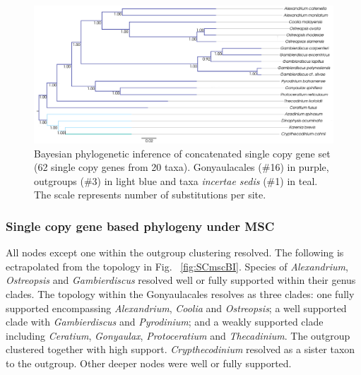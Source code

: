 \documentclass[12pt]{article}
\begin{document}
\begin{figure} 
\includegraphics[scale=.3]{figures/SC-concat-BI.png} 
\caption{Bayesian phylogenetic inference of concatenated single copy gene set (62 single copy genes from 20 taxa). Gonyaulacales (\#16) in purple, outgroups (\#3) in light blue and taxa \textit{incertae sedis} (\#1) in teal. The scale represents number of substitutions per site.} 
\label{fig:SCconcatBI}
\end{figure} 
\FloatBarrier

\subsubsection*{Single copy gene based phylogeny under MSC}
\FloatBarrier 
All nodes except one within the outgroup clustering resolved.
The following is ectrapolated from the topology in Fig. ~\ref{fig:SCmscBI}. 
Species of \emph{Alexandrium}, \emph{Ostreopsis} and \emph{Gambierdiscus} resolved well or fully supported within their genus clades. 
The topology within the Gonyaulacales resolves as three clades: 
one fully supported encompassing \emph{Alexandrium}, \emph{Coolia} and \emph{Ostreopsis};
a well supported clade with \emph{Gambierdiscus} and \emph{Pyrodinium}; 
and a weakly supported clade including \emph{Ceratium}, \emph{Gonyaulax}, \emph{Protoceratium} and \emph{Thecadinium}. 
The outgroup clustered together with high support. 
\emph{Crypthecodinium} resolved as a sister taxon to the outgroup. 
Other deeper nodes were well or fully supported.
\end{document}

